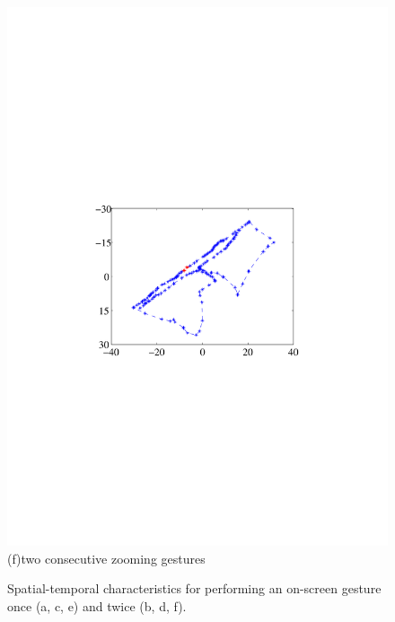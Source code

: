 \begin{figure}[!t]
{\begin{minipage}[t]{0.19\textwidth}
            \includegraphics[width=\textwidth]{fig/gesture-distinction6.pdf}\\
            \centering \footnotesize (f)two consecutive zooming gestures
            \end{minipage}
        }
        \caption{Spatial-temporal characteristics for performing an on-screen gesture once (a, c, e) and twice (b, d, f).}
        \label{fig:gesture-distinction}
    \end{figure}

